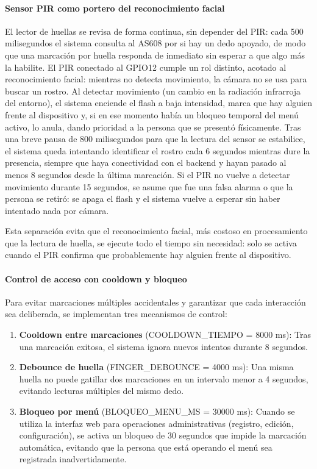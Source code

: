 \paragraph{Sensor PIR como portero del reconocimiento facial}

El lector de huellas se revisa de forma continua, sin depender del PIR: cada 500 milisegundos el sistema consulta al AS608 por si hay un dedo apoyado, de modo que una marcación por huella responda de inmediato sin esperar a que algo más la habilite. El PIR conectado al GPIO12 cumple un rol distinto, acotado al reconocimiento facial: mientras no detecta movimiento, la cámara no se usa para buscar un rostro. Al detectar movimiento (un cambio en la radiación infrarroja del entorno), el sistema enciende el flash a baja intensidad, marca que hay alguien frente al dispositivo y, si en ese momento había un bloqueo temporal del menú activo, lo anula, dando prioridad a la persona que se presentó físicamente. Tras una breve pausa de 800 milisegundos para que la lectura del sensor se estabilice, el sistema queda intentando identificar el rostro cada 6 segundos mientras dure la presencia, siempre que haya conectividad con el backend y hayan pasado al menos 8 segundos desde la última marcación. Si el PIR no vuelve a detectar movimiento durante 15 segundos, se asume que fue una falsa alarma o que la persona se retiró: se apaga el flash y el sistema vuelve a esperar sin haber intentado nada por cámara.

Esta separación evita que el reconocimiento facial, más costoso en procesamiento que la lectura de huella, se ejecute todo el tiempo sin necesidad: solo se activa cuando el PIR confirma que probablemente hay alguien frente al dispositivo.

\paragraph{Control de acceso con cooldown y bloqueo}

Para evitar marcaciones múltiples accidentales y garantizar que cada interacción sea deliberada, se implementan tres mecanismos de control:

\begin{enumerate}
    \item \textbf{Cooldown entre marcaciones} (COOLDOWN\_TIEMPO = 8000 ms): Tras una marcación exitosa, el sistema ignora nuevos intentos durante 8 segundos.
    \item \textbf{Debounce de huella} (FINGER\_DEBOUNCE = 4000 ms): Una misma huella no puede gatillar dos marcaciones en un intervalo menor a 4 segundos, evitando lecturas múltiples del mismo dedo.
    \item \textbf{Bloqueo por menú} (BLOQUEO\_MENU\_MS = 30000 ms): Cuando se utiliza la interfaz web para operaciones administrativas (registro, edición, configuración), se activa un bloqueo de 30 segundos que impide la marcación automática, evitando que la persona que está operando el menú sea registrada inadvertidamente.
\end{enumerate}

